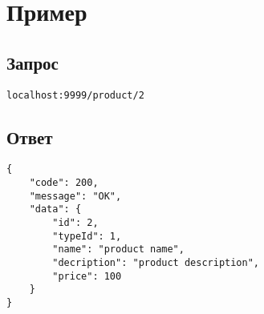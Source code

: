 \section*{Пример}

\subsection*{Запрос}

\begin{lstlisting}
localhost:9999/product/2
\end{lstlisting}
\hfill

\subsection*{Ответ}

\begin{lstlisting}
{
    "code": 200,
    "message": "OK",
    "data": {
        "id": 2,
        "typeId": 1,
        "name": "product name",
        "decription": "product description",
        "price": 100
    }
}
\end{lstlisting}
\hfill